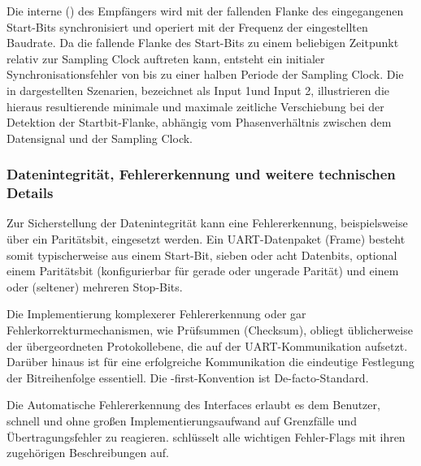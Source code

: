 Die interne  () des Empf\"angers wird mit der fallenden Flanke des eingegangenen Start-Bits synchronisiert und operiert mit der Frequenz der eingestellten Baudrate. Da die fallende Flanke des Start-Bits zu einem beliebigen Zeitpunkt relativ zur Sampling Clock auftreten kann, entsteht ein initialer Synchronisationsfehler von bis zu einer halben Periode der Sampling Clock. Die in  dargestellten Szenarien, bezeichnet als \glqq Input 1\grqq und \glqq Input 2\grqq, illustrieren die hieraus resultierende minimale und maximale zeitliche Verschiebung bei der Detektion der Startbit-Flanke, abh\"angig vom Phasenverh\"altnis zwischen dem Datensignal und der Sampling Clock.

\subsubsection{Datenintegrit\"at, Fehlererkennung und weitere technischen Details}
\label{sec:datenintegritaet}

Zur Sicherstellung der Datenintegrit\"at kann eine Fehlererkennung, beispielsweise \"uber ein Parit\"atsbit, eingesetzt werden. Ein UART-Datenpaket (Frame) besteht somit typischerweise aus einem Start-Bit, sieben oder acht Datenbits, optional einem Parit\"atsbit (konfigurierbar f\"ur gerade oder ungerade Parit\"at) und einem oder (seltener) mehreren Stop-Bits. 

Die Implementierung komplexerer Fehlererkennung oder gar Fehlerkorrekturmechanismen, wie \zB Pr\"ufsummen (Checksum), obliegt \"ublicherweise der \"ubergeordneten Protokollebene, die auf der UART-Kommunikation aufsetzt. Dar\"uber hinaus ist f\"ur eine erfolgreiche Kommunikation die eindeutige Festlegung der Bitreihenfolge essentiell. Die -first-Konvention ist De-facto-Standard.

Die Automatische Fehlererkennung des Interfaces erlaubt es dem Benutzer, schnell und ohne gro{\ss}en Implementierungsaufwand auf Grenzf\"alle und \"Ubertragungsfehler zu reagieren.  schl\"usselt alle wichtigen Fehler-Flags mit ihren zugeh\"origen Beschreibungen auf.

